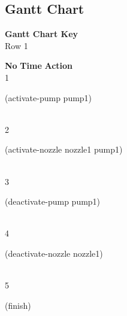 \documentclass[a4paper,12pt]{article}
\newcommand{\action}[1]{{\sf #1}}
\newcommand{\listrowg}[1]{\begin{minipage}[t]{10cm} #1 \end{minipage}}
\begin{document}
\subsection{Gantt Chart}
{\bf Gantt Chart Key}\\
Row 1
\begin{tabbing}
{\bf No} \qquad \= {\bf Time} \qquad \= {\bf Action} \\
1  \> \listrowg{\action{(activate-pump pump1)}} \\
2  \> \listrowg{\action{(activate-nozzle nozzle1 pump1)}} \\
3  \> \listrowg{\action{(deactivate-pump pump1)}} \\
4  \> \listrowg{\action{(deactivate-nozzle nozzle1)}} \\
5  \> \listrowg{\action{(finish)}} \\
\end{tabbing}
\end{document}

